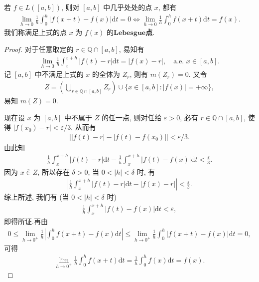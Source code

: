 \documentclass[../../main.tex]{subfiles}%
\begin{document}
\begin{corollary}
若 $f\in L([a,b])$, 则对 $[a,b]$ 中几乎处处的点 $x$, 都有
\begin{align*}
\lim_{h\rightarrow 0} \frac{1}{h}\int_0^h{\left| f\left( x+t \right) -f\left( x \right) \right|\mathrm{d}t}=0 \iff \lim_{h\rightarrow 0} \frac{1}{h}\int_0^h{f\left( x+t \right) \mathrm{d}t}=f\left( x \right) .
\end{align*}
我们称满足上式的点 $x$ 为 $f(x)$ 的$\mathbf{Lebesgue}$\textbf{点}.
\end{corollary}
\begin{proof}

对于任意取定的 $r\in\mathbb{Q}\cap[a,b]$, 易知有
\begin{align*}
\lim_{h\to 0} \frac{1}{h}\int_x^{x+h} |f(t)-r|\mathrm{d}t = |f(x)-r|, \quad \text{a.e. } x\in[a,b].
\end{align*}
记 $[a,b]$ 中不满足上式的 $x$ 的全体为 $Z_r$, 则有 $m(Z_r)=0$. 又令
\begin{align*}
Z = \left(\bigcup_{r\in\mathbb{Q}\cap[a,b]} Z_r\right) \cup \{x\in[a,b]: |f(x)|=+\infty\},
\end{align*}
易知 $m(Z)=0$.

现在设 $x$ 为 $[a,b]$ 中不属于 $Z$ 的任一点, 则对任给 $\varepsilon>0$, 必有 $r\in\mathbb{Q}\cap[a,b]$, 使得 $|f(x_0)-r|<\varepsilon/3$, 从而有
\begin{align*}
\big||f(t)-r|-|f(t)-f(x_0)|\big| < \varepsilon/3.
\end{align*}
由此知
\begin{align*}
\frac{1}{h}\int_x^{x+h} |f(t)-r|\mathrm{d}t - \frac{1}{h}\int_x^{x+h} |f(t)-f(x)|\mathrm{d}t < \frac{\varepsilon}{3}.
\end{align*}
因为 $x\overline{\in}Z$, 所以存在 $\delta>0$, 当 $0<|h|<\delta$ 时, 有
\begin{align*}
\left|\frac{1}{h}\int_x^{x+h} |f(t)-r|\mathrm{d}t - |f(x)-r|\right| < \frac{\varepsilon}{3}.
\end{align*}
综上所述, 我们有 (当 $0<|h|<\delta$ 时)
\begin{align*}
\frac{1}{h}\int_x^{x+h} |f(t)-f(x)|\mathrm{d}t < \varepsilon,
\end{align*}
即得所证.再由
\begin{align*}
0\leqslant \lim\limits_{h\rightarrow 0^+} \frac{1}{h}\left| \int_0^h{f\left( x+t \right) -f\left( x \right) \mathrm{d}t} \right|\leqslant \lim\limits_{h\rightarrow 0^+} \frac{1}{h}\int_0^h{\left| f\left( x+t \right) -f\left( x \right) \right|\mathrm{d}t}=0,
\end{align*}
可得
\begin{align*}
\lim_{h\rightarrow 0^+} \frac{1}{h}\int_0^h{f\left( x+t \right) \mathrm{d}t}=\frac{1}{h}\int_0^h{f\left( x \right) \mathrm{d}t}=f\left( x \right) .
\end{align*}

\end{proof}
\end{document}
